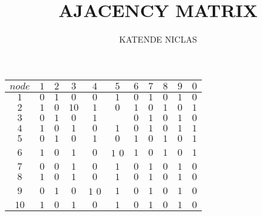 \documentclass[ 11pt ]{article}
\begin{document}
\author{KATENDE NICLAS}	
\title{AJACENCY MATRIX}


\begin{tabular}{|c|c|c|c|c|c|c|c|c|c|c|}
	\hline
 $node$	& $1$ & $2$ &  $3$& $4$ & $5$ & $6$ &$7$  & $8$ & $9$ &$0$ \\
	\hline
$1$	&  $0$& $1$ & $0$ & $0$& $1$ & $0$ &$1$  &$0$ &$1$  & $0$\\
	\hline
$2$	&$1$  & $0$  & $1$$0$ & $1$ &$0$  & $1$ &$0$  & $1$ &$0$ &$1$\\
	\hline
$3$	& $0$ & $1$ &$0$  & $1$ &  &$0$  &$1$  & $0$ & $1$&$0$ \\
	\hline
$4$	&$1$  &$0$  & $1$ & $0$ & $1$ &$0$  &$1$  &  $0$& $1$ &$1$ \\
	\hline
$5$	& $0$ & $1$ & $0$ & $1$ & $0$ &$1$  & $0$ &$1$  &$0$  &$1$ \\
	\hline
$6$	& $1$ & $0$ &$1$  &$0$  &$1$  $0$& $1$ & $0$ &$1$  & $0$ &$1$  \\
	\hline
$7$	&$0$  & $0$ & $1$ & $0$ & $1$ & $0$ &  $1$&$0$  & $1$ & $0$ \\
	\hline
$8$	&$1$  & $0$ &$1$  & $0$ & $1$ &$0$  &$1$  & $0$ &$1$ &$0$  \\
	\hline
$9$	& $0$ & $1$ & $0$ &$1$ $0$ &$1$  & $0$ & $1$ &$0$  &$1$  & $0$ \\
	\hline
$10$	& $1$ &$0$ &  $1$&$0$  & $1$ &$0$  & $1$ &$0$  &$1$ & $0$\\
	\hline
\end{tabular}
\end{document}
